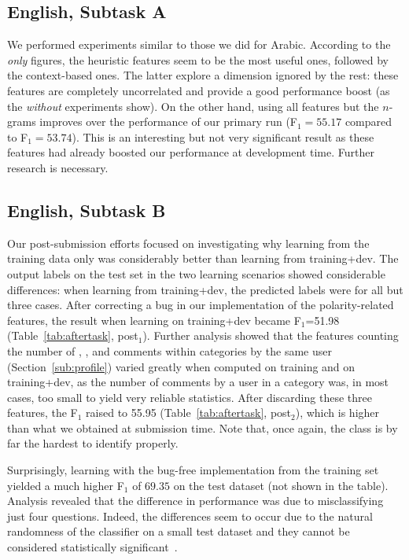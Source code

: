 \subsection{English, Subtask A} \label{sec:discussiona}

We performed experiments similar to those we did for Arabic. According to the 
\textit{only} figures, the heuristic features seem to be the most useful ones, 
followed by the context-based ones. The latter explore a 
dimension ignored by the rest:  these features are completely 
uncorrelated and provide a good performance boost (as the \textit{without} 
experiments show). On the other hand, using all features but the $n$-grams 
improves over the performance of our primary run (F$_1=55.17$ 
compared to F$_1=53.74$). This is an interesting but not very significant 
result as these features had already boosted our performance
at development time. Further research is necessary.
  
\subsection{English, Subtask B} \label{sec:discussionb}

Our post-submission efforts focused on investigating why learning from 
the training data only was considerably better than learning from training+dev. The output 
labels on the test set in the two learning scenarios showed considerable 
differences: when learning from training+dev, the predicted labels were \yes for 
all but three cases. After correcting a bug in our implementation of the 
polarity-related features, the result when learning on training+dev became 
F$_1$=51.98 (Table~\ref{tab:aftertask}, post$_1$). Further 
analysis showed that the features counting the number of \good, \bad, and \pot 
comments within categories by the same user (\cf Section~\ref{sub:profile}) 
varied greatly when computed on training and on training+dev,
as the number of comments by a user in a category was, in most 
cases, too small to yield very reliable statistics. After discarding these three 
features, the F$_1$ raised to 55.95 (Table~\ref{tab:aftertask}, post$_2$),
which is higher than what we obtained at submission time.
Note that, once again, the \unsure class is by far the hardest to identify properly.

Surprisingly, learning with the bug-free implementation from the training set 
yielded a much higher F$_1$ of $69.35$ on the test dataset (not shown in the table).
Analysis revealed that the difference in performance was due to misclassifying 
just four questions. Indeed, the differences seem to 
occur due to the natural randomness of the classifier on a small test dataset and they 
cannot be considered statistically significant~\cite{Marquez-EtAl:2015:SemEval}. 

